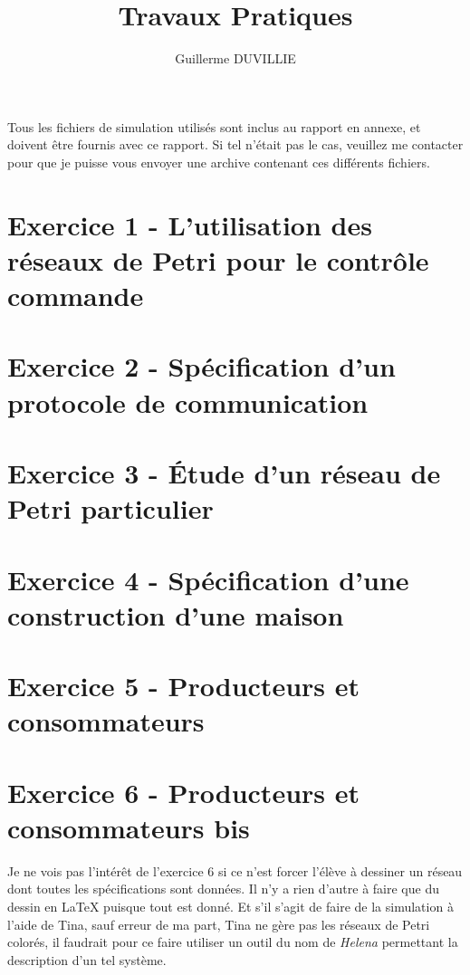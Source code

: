 \documentclass[a4paper,11pt]{article}
\author{}
\title{}
\title{Travaux Pratiques}
\author{Guillerme DUVILLIE}
\begin{document}
\maketitle

Tous les fichiers de simulation utilisés sont inclus au rapport en annexe, et doivent être fournis
avec ce rapport. Si tel n'était pas le cas, veuillez me contacter pour que je puisse vous envoyer
une archive contenant ces différents fichiers.

\section{Exercice 1 - L'utilisation des réseaux de Petri pour le contrôle commande}



\section{Exercice 2 - Spécification d'un protocole de communication}



\section{Exercice 3 - Étude d'un réseau de Petri particulier}



\section{Exercice 4 - Spécification d'une construction d'une maison}



\section{Exercice 5 - Producteurs et consommateurs}



\section{Exercice 6 - Producteurs et consommateurs bis}

Je ne vois pas l'intérêt de l'exercice $6$ si ce n'est forcer l'élève à dessiner un réseau dont
toutes les spécifications sont données. Il n'y a rien d'autre à faire que du dessin en \LaTeX{} puisque
tout est donné. Et s'il s'agit de faire de la simulation à l'aide de Tina, sauf erreur de ma part,
Tina ne gère pas les réseaux de Petri colorés, il faudrait pour ce faire utiliser un outil du nom de
\emph{Helena} permettant la description d'un tel système.
\end{document}
